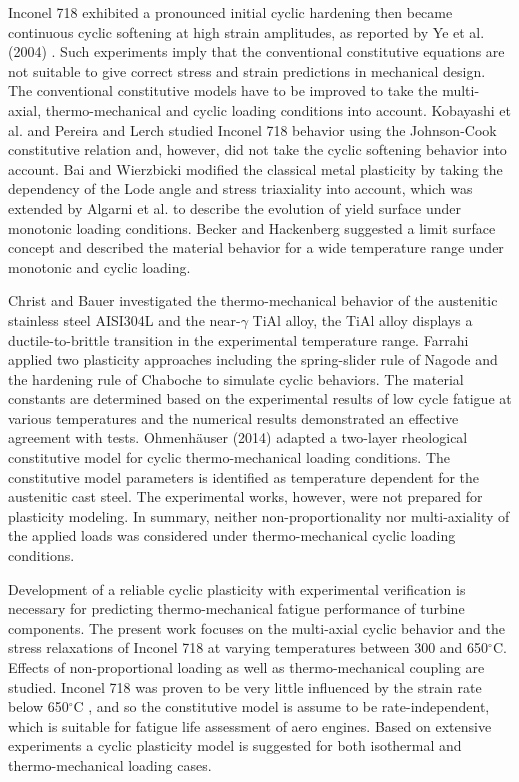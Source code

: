 \documentclass[preprint,5p,twocolumn,11pt,sort&compress]{elsarticle}
\begin{document}
Inconel 718 exhibited a pronounced initial cyclic hardening then became continuous cyclic softening at high strain amplitudes, as reported by  Ye et al. (2004) \cite{ye2004low} . Such experiments imply that the conventional constitutive equations are not suitable to give correct stress and strain predictions in mechanical design. The conventional constitutive models have to be improved to take the multi-axial, thermo-mechanical and cyclic loading conditions into account.
Kobayashi et al. \cite{Kobayashi2008389} and Pereira and Lerch  \cite{Pereira2001715} studied  Inconel 718 behavior using the Johnson-Cook constitutive relation and, however, did not take the cyclic softening behavior into account.
Bai and Wierzbicki  \cite{Bai20081071} modified the classical metal plasticity by taking the dependency of the Lode angle and stress triaxiality into account, which was extended by Algarni et al.  \cite{Algarni2015140} to describe the evolution of yield surface under monotonic loading conditions. Becker and Hackenberg \cite{Becker2011596} suggested a limit surface concept and described the material behavior for a wide temperature range under monotonic and cyclic loading.

Christ and Bauer \cite{Christ201259} investigated the thermo-mechanical behavior of the austenitic stainless steel AISI304L and the near-$\gamma$ TiAl alloy, the TiAl alloy displays a ductile-to-brittle transition in the experimental temperature range.
Farrahi  \cite{Farrahi2014245} applied two plasticity approaches including the spring-slider rule of Nagode and the hardening rule of Chaboche to simulate cyclic behaviors.
The material constants are determined based on the experimental results of low cycle fatigue at various temperatures and
the numerical results demonstrated an effective agreement with tests.
Ohmenh\"{a}user (2014) \cite{Ohmenhauser2014631} adapted a two-layer rheological constitutive model for cyclic thermo-mechanical loading conditions.
The constitutive model parameters is identified as temperature dependent for the austenitic cast steel. The experimental works, however, were not prepared for plasticity modeling. In summary, neither non-proportionality nor multi-axiality of the applied loads was considered under thermo-mechanical cyclic loading conditions.

Development of a reliable cyclic plasticity with experimental verification is necessary for predicting thermo-mechanical fatigue performance of turbine components.
The present work focuses on the  multi-axial cyclic behavior and the stress relaxations of Inconel 718 at varying temperatures between 300 and 650$^{\circ}$C. Effects of non-proportional loading as well as thermo-mechanical coupling are studied. Inconel 718 was proven to be very little influenced by the strain rate below 650$^{\circ}$C \cite{kim1988elevated}, and so the constitutive model is assume to be rate-independent, which is suitable for fatigue life assessment of aero engines. Based on extensive experiments a cyclic plasticity model is suggested for both isothermal and thermo-mechanical loading cases.
\end{document}
